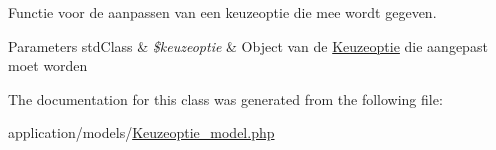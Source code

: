 Functie voor de aanpassen van een keuzeoptie die mee wordt gegeven. 


\begin{DoxyParams}[1]{Parameters}
std\+Class & {\em \$keuzeoptie} & Object van de \mbox{\hyperlink{class_keuzeoptie}{Keuzeoptie}} die aangepast moet worden \\
\hline
\end{DoxyParams}


The documentation for this class was generated from the following file\+:\begin{DoxyCompactItemize}
\item 
application/models/\mbox{\hyperlink{_keuzeoptie__model_8php}{Keuzeoptie\+\_\+model.\+php}}\end{DoxyCompactItemize}

